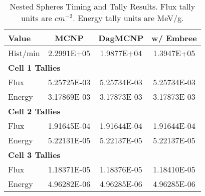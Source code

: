 \documentclass{anstrans}
\begin{document}
\begin{table}[h]

  \begin{center}
    \caption{Nested Spheres Timing and Tally Results. Flux tally units are $cm^{-2}$. Energy tally units are MeV/g.}
    
    \begin{tabular}{lccc}
      \toprule
      Value & MCNP & DagMCNP & w/ Embree \\
      \toprule
      Hist/min & 2.2991E+05 & 1.9877E+04 & 1.3947E+05 \\
      \hline
      \multicolumn{4}{l}{\textbf{Cell 1 Tallies}} \\
      \hline
      Flux  & 5.25725E-03 & 5.25734E-03 & 5.25734E-03 \\
      Energy  & 3.17869E-03 &  3.17873E-03 &  3.17873E-03 \\
      \hline
      \multicolumn{4}{l}{\textbf{Cell 2 Tallies}} \\
      \hline
      Flux  & 1.91645E-04 & 1.91644E-04 & 1.91644E-04 \\
      Energy  & 5.22131E-05 & 5.22137E-05 & 5.22137E-05 \\
      \hline
      \multicolumn{4}{l}{\textbf{Cell 3 Tallies}} \\
      \hline
      Flux  & 1.18371E-05 & 1.18376E-05 & 1.18410E-05 \\
      Energy  & 4.96282E-06 & 4.96285E-06 & 4.96285E-06 \\
      \bottomrule
                        
    \end{tabular}


  \end{center}
\vspace{-0.2cm}
\end{table}
\end{document}
